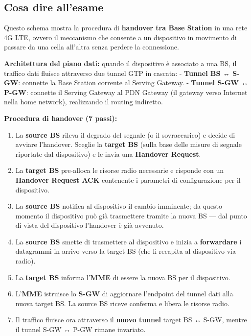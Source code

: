 \documentclass[
  italian,
  openany]{book}
\providecommand{\tightlist}{%
  \setlength{\itemsep}{0pt}\setlength{\parskip}{0pt}}
\begin{document}
\subsection{Cosa dire all'esame}\label{cosa-dire-allesame-5}

Questo schema mostra la procedura di \textbf{handover tra Base Station}
in una rete 4G LTE, ovvero il meccanismo che consente a un dispositivo
in movimento di passare da una cella all'altra senza perdere la
connessione.

\textbf{Architettura del piano dati:} quando il dispositivo è associato
a una BS, il traffico dati fluisce attraverso due tunnel GTP in cascata:
- \textbf{Tunnel BS ↔ S-GW}: connette la Base Station corrente al
Serving Gateway. - \textbf{Tunnel S-GW ↔ P-GW}: connette il Serving
Gateway al PDN Gateway (il gateway verso Internet nella home network),
realizzando il routing indiretto.

\textbf{Procedura di handover (7 passi):}

\begin{enumerate}
\def\labelenumi{\arabic{enumi}.}
\tightlist
\item
  La \textbf{source BS} rileva il degrado del segnale (o il
  sovraccarico) e decide di avviare l'handover. Sceglie la
  \textbf{target BS} (sulla base delle misure di segnale riportate dal
  dispositivo) e le invia una \textbf{Handover Request}.
\item
  La \textbf{target BS} pre-alloca le risorse radio necessarie e
  risponde con un \textbf{Handover Request ACK} contenente i parametri
  di configurazione per il dispositivo.
\item
  La \textbf{source BS} notifica al dispositivo il cambio imminente; da
  questo momento il dispositivo può già trasmettere tramite la nuova BS
  --- dal punto di vista del dispositivo l'handover è già avvenuto.
\item
  La \textbf{source BS} smette di trasmettere al dispositivo e inizia a
  \textbf{forwardare} i datagrammi in arrivo verso la target BS (che li
  recapita al dispositivo via radio).
\item
  La \textbf{target BS} informa l'\textbf{MME} di essere la nuova BS per
  il dispositivo.
\item
  L'\textbf{MME} istruisce lo \textbf{S-GW} di aggiornare l'endpoint del
  tunnel dati alla nuova target BS. La source BS riceve conferma e
  libera le risorse radio.
\item
  Il traffico fluisce ora attraverso il \textbf{nuovo tunnel} target BS
  ↔ S-GW, mentre il tunnel S-GW ↔ P-GW rimane invariato.
\end{enumerate}
\end{document}
